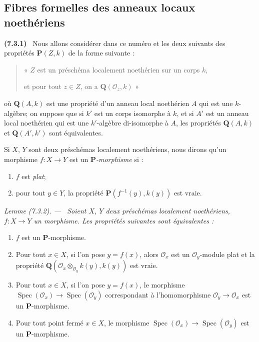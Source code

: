 \documentclass[10pt,oneside]{book}
\newcommand{\oldpage}[2][]{%
  \setcounter{footnote}{0}%
  \marginpar{\scriptsize\textbf{#1}~|~#2}\ignorespaces}
\newenvironment{env}[1][]{\par\medskip\noindent\textbf{(#1)}\ }{\par}
\newenvironment{lemma}[1][]{%
  \par\medskip\noindent\itshape Lemme (#1). ---\ }{\par}
\begin{document}
\subsection{Fibres formelles des anneaux locaux noethériens}
\label{subsection:IV.7.3-fr}

\begin{env}[7.3.1]
\label{IV.2.s7.3.1-fr}
Nous allons considérer dans ce numéro et les deux suivants des propriétés
$\boldsymbol P(Z,k)$ de la forme suivante :
\begin{quote}
« $Z$ est un préschéma localement noethérien sur un corps $k$,

et pour tout $z\in Z$, on a $\boldsymbol Q(\mathscr O_z,k)$ »
\end{quote}
où $\boldsymbol Q(A,k)$ est une propriété d'un anneau local noethérien $A$
qui est une $k$-algèbre; on suppose que si $k'$ est un corps isomorphe à
$k$, et si $A'$ est un anneau local noethérien qui est une $k'$-algèbre
di-isomorphe à $A$, les propriétés $\boldsymbol Q(A,k)$ et
$\boldsymbol Q(A',k')$ sont équivalentes.
\end{env}

\oldpage[IV-2]{193}

Si $X$, $Y$ sont deux préschémas localement noethériens, nous dirons qu'un
morphisme $f:X\to Y$ est un \emph{$\boldsymbol P$-morphisme} si :
\begin{enumerate}
\item[1\textsuperscript{o}] $f$ est \emph{plat};
\item[2\textsuperscript{o}] pour tout $y\in Y$, la propriété
$\boldsymbol P(f^{-1}(y),k(y))$ est vraie.
\end{enumerate}

\begin{lemma}[7.3.2]
\label{IV.2.s7.3.2-fr}
Soient $X$, $Y$ deux préschémas localement noethériens,
$f:X\to Y$ un morphisme. Les propriétés suivantes sont équivalentes :
\begin{enumerate}
\item[\emph{a)}] $f$ est un $\boldsymbol P$-morphisme.
\item[\emph{b)}] Pour tout $x\in X$, si l'on pose $y=f(x)$, alors $\mathscr O_x$ est
un $\mathscr O_y$-module plat et la propriété
$\boldsymbol Q(\mathscr O_x\otimes_{\mathscr O_y}k(y),k(y))$ est vraie.
\item[\emph{c)}] Pour tout $x\in X$, si l'on pose $y=f(x)$, le morphisme
$\operatorname{Spec}(\mathscr O_x)\to\operatorname{Spec}(\mathscr O_y)$
correspondant à l'homomorphisme $\mathscr O_y\to\mathscr O_x$ est un
$\boldsymbol P$-morphisme.
\item[\emph{c$'$)}] Pour tout point fermé $x\in X$, le morphisme
$\operatorname{Spec}(\mathscr O_x)\to\operatorname{Spec}(\mathscr O_y)$
est un $\boldsymbol P$-morphisme.
\end{enumerate}
\end{lemma}
\end{document}

